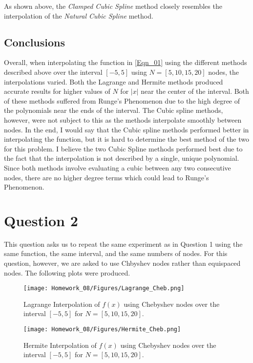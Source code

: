 \documentclass{article}
\begin{document}
As shown above, the \textit{Clamped Cubic Spline} method closely resembles the interpolation of the \textit{Natural Cubic Spline} method. 

\subsection{Conclusions}
Overall, when interpolating the function in \ref{Eqn_01} using the different methods described above over the interval \([-5,5]\) using \(N=[5,10,15,20]\) nodes, the interpolations varied. Both the Lagrange and Hermite methods produced accurate results for higher values of \(N\) for \(|x|\) near the center of the interval. Both of these methods suffered from Runge's Phenomenon due to the high degree of the polynomials near the ends of the interval. The Cubic spline methods, however, were not subject to this as the methods interpolate smoothly between nodes. In the end, I would say that the Cubic spline methods performed better in interpolating the function, but it is hard to determine the best method of the two for this problem.
I believe the two Cubic Spline methods performed best due to the fact that the interpolation is not described by a single, unique polynomial. Since both methods involve evaluating a cubic between any two consecutive nodes, there are no higher degree terms which could lead to Runge's Phenomenon.

\section{Question 2}
This question asks us to repeat the same experiment as in Question 1 using the same function, the same interval, and the same numbers of nodes. For this question, however, we are asked to use Chbyshev nodes rather than equispaced nodes. The following plots were produced.
\begin{figure}[h!]
    \centering
    \texttt{[image: Homework\_08/Figures/Lagrange\_Cheb.png]}
    \caption{Lagrange Interpolation of \(f(x)\) using Chebyshev nodes over the interval \([-5,5]\) for \(N = [5,10,15,20]\).}
    \label{fig:Lagrange_Cheb}
\end{figure}

\begin{figure}[h!]
    \centering
    \texttt{[image: Homework\_08/Figures/Hermite\_Cheb.png]}
    \caption{Hermite Interpolation of \(f(x)\) using Chebyshev nodes over the interval \([-5,5]\) for \(N = [5,10,15,20]\).}
    \label{fig:Hermite_Cheb}
\end{figure}
\end{document}
